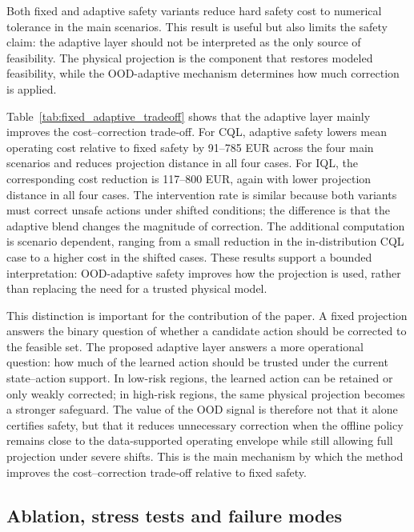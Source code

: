 \documentclass[preprint,12pt]{elsarticle}
\begin{document}
Both fixed and adaptive safety variants reduce hard safety cost to numerical tolerance in the main scenarios. This result is useful but also limits the safety claim: the adaptive layer should not be interpreted as the only source of feasibility. The physical projection is the component that restores modeled feasibility, while the OOD-adaptive mechanism determines how much correction is applied.



Table~\ref{tab:fixed_adaptive_tradeoff} shows that the adaptive layer mainly improves the cost--correction trade-off. For CQL, adaptive safety lowers mean operating cost relative to fixed safety by 91--785 EUR across the four main scenarios and reduces projection distance in all four cases. For IQL, the corresponding cost reduction is 117--800 EUR, again with lower projection distance in all four cases. The intervention rate is similar because both variants must correct unsafe actions under shifted conditions; the difference is that the adaptive blend changes the magnitude of correction. The additional computation is scenario dependent, ranging from a small reduction in the in-distribution CQL case to a higher cost in the shifted cases. These results support a bounded interpretation: OOD-adaptive safety improves how the projection is used, rather than replacing the need for a trusted physical model.

This distinction is important for the contribution of the paper. A fixed projection answers the binary question of whether a candidate action should be corrected to the feasible set. The proposed adaptive layer answers a more operational question: how much of the learned action should be trusted under the current state--action support. In low-risk regions, the learned action can be retained or only weakly corrected; in high-risk regions, the same physical projection becomes a stronger safeguard. The value of the OOD signal is therefore not that it alone certifies safety, but that it reduces unnecessary correction when the offline policy remains close to the data-supported operating envelope while still allowing full projection under severe shifts. This is the main mechanism by which the method improves the cost--correction trade-off relative to fixed safety.

\subsection{Ablation, stress tests and failure modes}
\end{document}
